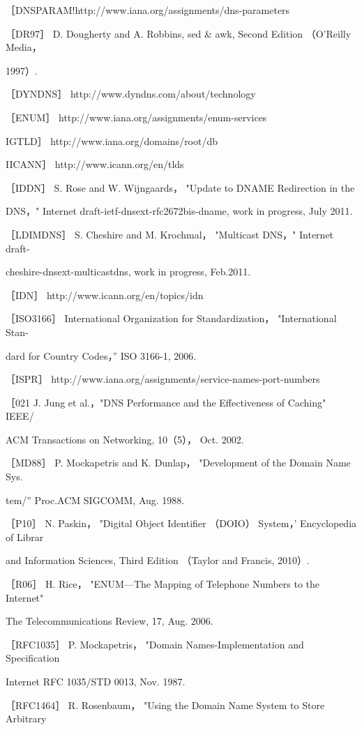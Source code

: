 ［DNSPARAM!http://www.iana.org/assignments/dns-parameters

［DR97］ D. Dougherty and A. Robbins, sed \& awk, Second Edition （O'Reilly Media，

1997）.

［DYNDNS］ http://www.dyndns.com/about/technology

［ENUM］ http://www.iana.org/assignments/enum-services

IGTLD］ http://www.iana.org/domains/root/db

IICANN］ http://www.icann.org/en/tlds

［IDDN］ S. Rose and W. Wijngaards， "Update to DNAME Redirection in the

DNS，" Internet draft-ietf-dnsext-rfc2672bis-dname, work in progress, July 2011.

［LDIMDNS］ S. Cheshire and M. Krochmal， "Multicast DNS，" Internet draft-

cheshire-dnsext-multicastdns, work in progress, Feb.2011.

［IDN］ http://www.icann.org/en/topics/idn

［ISO3166］ International Organization for Standardization， "International Stan-

dard for Country Codes，” ISO 3166-1, 2006.

［ISPR］ http://www.iana.org/assignments/service-names-port-numbers

［021 J. Jung et al.，"DNS Performance and the Effectiveness of Caching" IEEE/

ACM Transactions on Networking, 10（5）， Oct. 2002.

［MD88］ P. Mockapetris and K. Dunlap， "Development of the Domain Name Sys.

tem/” Proc.ACM SIGCOMM, Aug. 1988.

［P10］ N. Paskin， "Digital Object Identifier （DOIO） System，' Encyclopedia of Librar

and Information Sciences, Third Edition （Taylor and Francis, 2010）.

［R06］ H. Rice， "ENUM—The Mapping of Telephone Numbers to the Internet"

The Telecommunications Review, 17, Aug. 2006.

［RFC1035］ P. Mockapetris， "Domain Names-Implementation and Specification

Internet RFC 1035/STD 0013, Nov. 1987.

［RFC1464］ R. Rosenbaum， "Using the Domain Name System to Store Arbitrary

